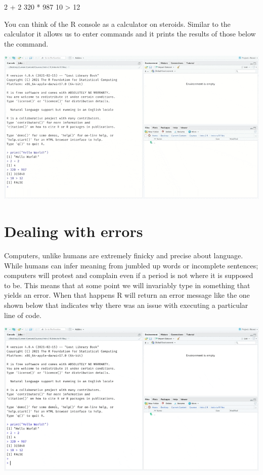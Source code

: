 \documentclass[
]{book}
\newenvironment{Shaded}{\begin{snugshade}}{\end{snugshade}}
\newcommand{\DecValTok}[1]{\textcolor[rgb]{0.00,0.00,0.81}{#1}}
\newcommand{\SpecialCharTok}[1]{\textcolor[rgb]{0.00,0.00,0.00}{#1}}
\begin{document}
\begin{Shaded}
\begin{Highlighting}[]
\DecValTok{2} \SpecialCharTok{+} \DecValTok{2}
\DecValTok{320} \SpecialCharTok{*} \DecValTok{987}
\DecValTok{10} \SpecialCharTok{\textgreater{}} \DecValTok{12}
\end{Highlighting}
\end{Shaded}

You can think of the R console as a calculator on steroids. Similar to the calculator it allows us to enter commands and it prints the results of those below the command.

\includegraphics{assets/ch_1-setup/gifs/console.gif}

\hypertarget{dealing-with-errors}{%
\section{Dealing with errors}\label{dealing-with-errors}}

Computers, unlike humans are extremely finicky and precise about language. While humans can infer meaning from jumbled up words or incomplete sentences; computers will protest and complain even if a period is not where it is supposed to be. This means that at some point we will invariably type in something that yields an error. When that happens R will return an error message like the one shown below that indicates why there was an issue with executing a particular line of code.

\includegraphics{assets/ch_1-setup/gifs/an_error.gif}
\end{document}
